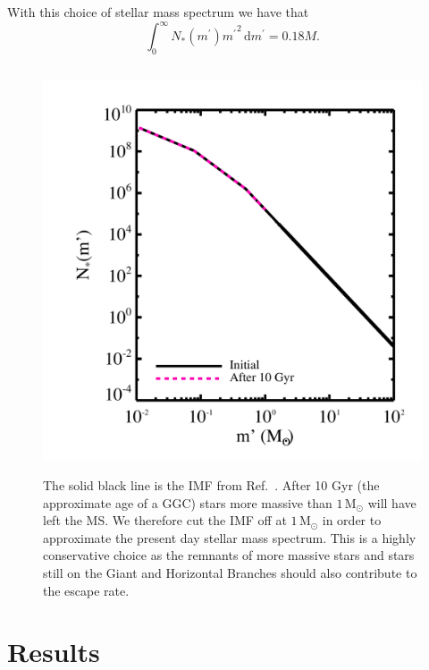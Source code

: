 \documentclass[aps,floatfix,prd,showpacs]{revtex4}
\newcommand{\diff}{\mathrm{d}}
\newcommand{\mpr}{m^\prime}
\newcommand{\Msun}{\textrm{M}_\odot}
\begin{document}
With this choice of stellar mass spectrum we have that
%
\begin{equation}
	\int^\infty_0{N_*(\mpr)\mpr}^2\,\diff \mpr = 0.18M.
\end{equation}
%
%
%
\begin{figure}[htp]
\centering
\includegraphics[width=12cm, height=12cm]{IMF}
\caption{The solid black line is the IMF from Ref.~\cite{Kroupa2001}. After 10 Gyr (the approximate age of a GGC) stars more massive than $1\, \Msun$ will have left the MS.  We therefore cut the IMF off at $1\, \Msun$ in order to approximate the present day stellar mass spectrum.  This is a highly conservative choice as the remnants of more massive stars and stars still on the Giant and Horizontal Branches should also contribute to the escape rate.}
\label{IMF}
\end{figure}
%
%

\section{Results}
\label{section:results}
\end{document}
